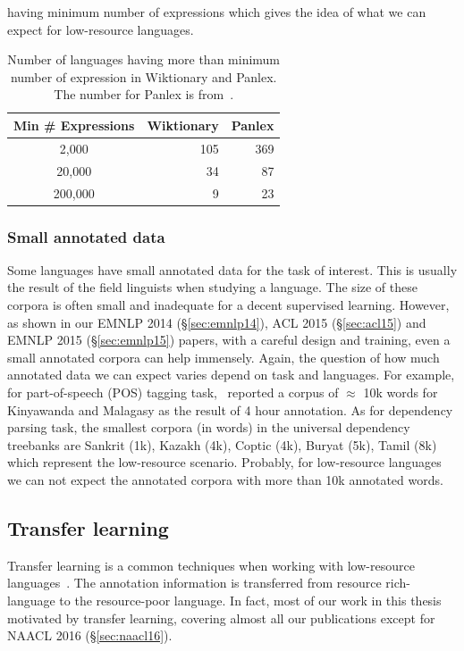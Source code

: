 \documentclass[12pt,twoside,final,hidelinks]{ltthesis}
\theoremstyle{definition}
\newcommand\emnlpiv{EMNLP 2014 (\S\ref{sec:emnlp14})}
\newcommand\aclv{ACL 2015 (\S\ref{sec:acl15})}
\newcommand\emnlpv{EMNLP 2015 (\S\ref{sec:emnlp15})}
\newcommand\naaclvi{NAACL 2016 (\S\ref{sec:naacl16})}
\begin{document}
having minimum number of expressions which gives the idea of what we can expect for low-resource languages. 
\begin{table}
\centering
\begin{tabular}{crr}
\toprule
Min \# Expressions & Wiktionary & Panlex \\
\midrule
2,000          & 105        & 369    \\
20,000         & 34         & 87     \\
200,000        & 9          & 23    \\
\bottomrule
\end{tabular}
\caption{Number of languages having more than minimum number of expression in Wiktionary and Panlex. The number for Panlex is from~\protect{}.}
\label{tab:expression_wik_pan}
\end{table}


\subsubsection{Small annotated data}
Some languages have small annotated data for the task of interest. This is usually the result 
of the field linguists when studying a language. The size of these corpora is often small and 
inadequate for a decent supervised learning. However, as shown in our \emnlpiv{}, \aclv{} and 
\emnlpv{} papers, with a careful design and training, even a small annotated corpora can help immensely. Again, the question of how much annotated data we can expect varies depend on task and languages. For example, for part-of-speech (POS) tagging task,~ reported a corpus of $\approx$ 10k words for Kinyawanda and Malagasy as the result of 4 hour annotation. As for dependency parsing task, the smallest corpora (in words) in the universal dependency treebanks are Sankrit (1k), Kazakh (4k), Coptic (4k), Buryat (5k), Tamil (8k) which represent the low-resource scenario. Probably, for low-resource languages we can not expect the annotated corpora with more than 10k annotated words. 

\subsection{Transfer learning}
Transfer learning is a common techniques when working with low-resource 
languages~\cite{TackstromDPMN13,Das:2011,YarowskyAndNgai,duongIJCNLP,Hwa:2005:BPV,P14-1126}. The annotation information is transferred from resource rich-language to the resource-poor language. In fact, most of our work in this thesis motivated by transfer learning, covering almost all our publications except for \naaclvi. 
\end{document}
